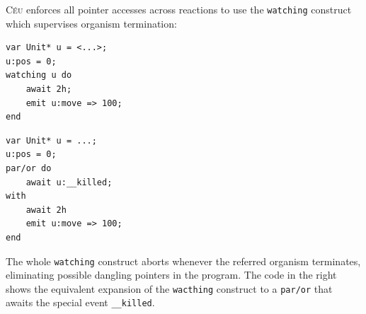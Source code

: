 \documentclass{acm_proc_article-sp}
\newcommand{\CEU}{\textsc{C\'{e}u}\xspace}
\newcommand{\code}[1] {{\small{\texttt{#1}}}}
\newcommand{\1}{\;}
\newcommand{\2}{\;\;}
\newcommand{\3}{\;\;\;}
\newcommand{\5}{\;\;\;\;\;}
\begin{document}
\CEU enforces all pointer accesses across reactions to use the \code{watching} 
construct which supervises organism termination:

\begin{minipage}[t]{0.48\linewidth}
\begin{lstlisting}
var Unit* u = <...>;
u:pos = 0;
watching u do
    await 2h;
    emit u:move => 100;
end
\end{lstlisting}
\end{minipage}
%
\begin{minipage}[t]{0.48\linewidth}
\begin{lstlisting}
var Unit* u = ...;
u:pos = 0;
par/or do
    await u:__killed;
with
    await 2h
    emit u:move => 100;
end
\end{lstlisting}
\end{minipage}

The whole \code{watching} construct aborts whenever the referred organism 
terminates, eliminating possible dangling pointers in the program.
%
The code in the right shows the equivalent expansion of the \code{wacthing} 
construct to a \code{par/or} that awaits the special event \code{\_\_killed}.

\end{document}
